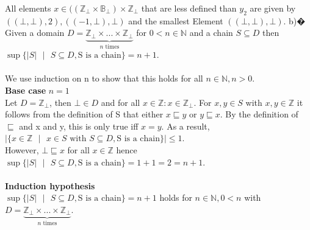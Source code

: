 \documentclass[a4paper,12pt,oneside]{book}
\begin{document}
\begin{center}
\end{center}
All elements $x \in (( \mathbb{Z}_{\bot} \times \mathbb{B}_{\bot}) \times \mathbb{Z}_{\bot}$ that are less defined than $y_2$ are given by $((\bot,\bot),2),((-1,\bot),\bot)$ and the smallest Element $((\bot,\bot),\bot)$.
\newpage
b)�\\
Given a domain $D= \underbrace{\mathbb{Z}_{\bot} \times ... \times \mathbb{Z}_{\bot}}_{n\text{\ times}}$ for $0<n \in \mathbb{N}$ and a chain $S \subseteq D$ then $\sup \{\vert S \vert \text{ } \vert  \text{ }  S \subseteq D, \text{S is a chain}\} = n+1$.\\ \\
We use induction on n to show that this holds for all $n \in \mathbb{N}, n>0$.\\

\textbf{Base case} $n = 1$\\
Let $D=\mathbb{Z}_{\bot}$, then $\bot \in D$ and for all $x \in \mathbb{Z}: x \in \mathbb{Z}_{\bot}$. For $x,y \in S$ with $x,y \in \mathbb{Z}$ it follows from the definition of S that either $ x \sqsubseteq y$ or $y \sqsubseteq x$. By the definition of $\sqsubseteq$ and x and y, this is only true iff $x=y$. As a result,  $\vert \{x \in \mathbb{Z} \text{ } \vert  \text{ }  x \in  S\text{ with }S \subseteq D, \text{S is a chain}\} \vert \leq 1$.\\
However, $\bot \sqsubseteq x$ for all $x \in \mathbb{Z}$ hence $\sup \{\vert S \vert \text{ } \vert  \text{ }  S \subseteq D, \text{S is a chain}\} = 1+1 = 2 = n+1$.\\ \\

\textbf{Induction hypothesis} \\
$\sup \{\vert S \vert \text{ } \vert  \text{ }  S \subseteq D, \text{S is a chain}\} = n+1$ holds for $n \in \mathbb{N}, 0<n$ with $D= \underbrace{\mathbb{Z}_{\bot} \times ... \times \mathbb{Z}_{\bot}}_{n\text{\ times}}$.\\
\end{document}
